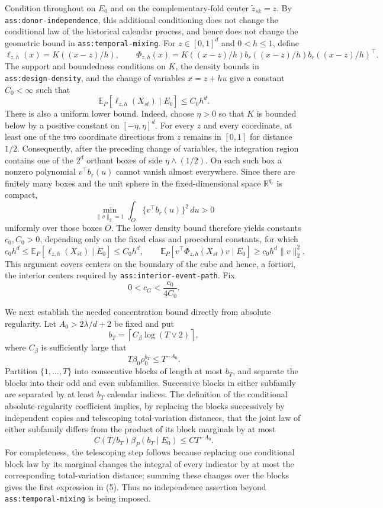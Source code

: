 Condition throughout on \(E_0\) and on the complementary-fold center \(\widetilde z_{sk}=z\).  By \texttt{ass:donor-independence}, this additional conditioning does not change the conditional law of the historical calendar process, and hence does not change the geometric bound in \texttt{ass:temporal-mixing}.  For \(z\in[0,1]^d\) and \(0<h\le1\), define
\[
 \ell_{z,h}(x)=K((x-z)/h),
 \qquad
 \Phi_{z,h}(x)=K((x-z)/h)b_r((x-z)/h)b_r((x-z)/h)^{\top}.
\]
The support and boundedness conditions on \(K\), the density bounds in \texttt{ass:design-density}, and the change of variables \(x=z+hu\) give a constant \(C_0<\infty\) such that
\[
 \mathbb E_P[\ell_{z,h}(X_{st})\mid E_0]
 \le C_0h^d.
\tag{1}
\]
There is also a uniform lower bound.  Indeed, choose \(\eta>0\) so that \(K\) is bounded below by a positive constant on \([-\eta,\eta]^d\).  For every \(z\) and every coordinate, at least one of the two coordinate directions from \(z\) remains in \([0,1]\) for distance \(1/2\).  Consequently, after the preceding change of variables, the integration region contains one of the \(2^d\) orthant boxes of side \(\eta\wedge(1/2)\).  On each such box a nonzero polynomial \(v^{\top}b_r(u)\) cannot vanish almost everywhere.  Since there are finitely many boxes and the unit sphere in the fixed-dimensional space \(\mathbb R^{q_r}\) is compact,
\[
 \min_{\|v\|_2=1}\int_{O}
       \{v^{\top}b_r(u)\}^2\,du>0
\]
uniformly over those boxes \(O\).  The lower density bound therefore yields constants \(c_0,C_0>0\), depending only on the fixed class and procedural constants, for which
\[
 c_0h^d
 \le \mathbb E_P[\ell_{z,h}(X_{st})\mid E_0]
 \le C_0h^d,
 \qquad
 \mathbb E_P[v^{\top}\Phi_{z,h}(X_{st})v\mid E_0]
 \ge c_0h^d\|v\|_2^2.
\tag{2}
\]
This argument covers centers on the boundary of the cube and hence, a fortiori, the interior centers required by \texttt{ass:interior-event-path}.  Fix
\[
 0<c_G<\frac{c_0}{4C_0}.
\tag{3}
\]

We next establish the needed concentration bound directly from absolute regularity.  Let \(A_0>2\lambda/d+2\) be fixed and put
\[
 b_T=\left\lceil C_\beta\log(T\vee2)\right\rceil,
\]
where \(C_\beta\) is sufficiently large that
\[
 T\beta_0\rho_0^{b_T}\le T^{-A_0}.
\tag{4}
\]
Partition \(\{1,\ldots,T\}\) into consecutive blocks of length at most \(b_T\), and separate the blocks into their odd and even subfamilies.  Successive blocks in either subfamily are separated by at least \(b_T\) calendar indices.  The definition of the conditional absolute-regularity coefficient implies, by replacing the blocks successively by independent copies and telescoping total-variation distances, that the joint law of either subfamily differs from the product of its block marginals by at most
\[
 C(T/b_T)\beta_P(b_T\mid E_0)
 \le CT^{-A_0}.
\tag{5}
\]
For completeness, the telescoping step follows because replacing one conditional block law by its marginal changes the integral of every indicator by at most the corresponding total-variation distance; summing these changes over the blocks gives the first expression in (5).  Thus no independence assertion beyond \texttt{ass:temporal-mixing} is being imposed.

